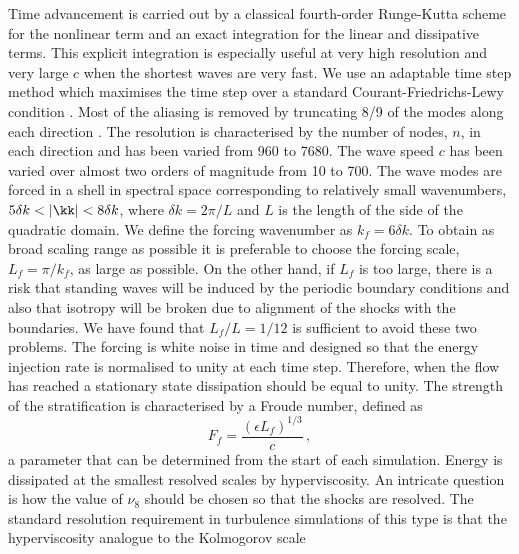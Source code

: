 %
Time advancement is carried out by a classical fourth-order Runge-Kutta scheme
for the nonlinear term and an exact integration for the linear and dissipative
terms. This explicit integration is especially useful at very high resolution
and very large $c$ when the shortest waves are very fast. We use an adaptable
time step method which maximises the time step over a standard
Courant-Friedrichs-Lewy condition \citep{Lundbladh1999, AugierChomazBillant2012}.
%
Most of the aliasing is removed by truncating 8/9 of the modes along each
direction \citep[for a detailed discussion on the issues of the non-conservation
of the non-quadratic energy and the aliasing errors in the truncated one-layer
shallow water model, see][]{FargeSadourny1989}. The resolution is characterised
by the number of nodes, $n$, in each direction and has been varied from 960
to 7680.
%
The wave speed $c$ has been varied over almost two orders of magnitude from 10
to 700. The wave modes are forced in a shell in spectral space corresponding to
relatively small wavenumbers, $ 5 \delta k < |\kk| < 8 \delta k$, where $
\delta k = 2 \pi /L $ and $ L $ is the length of the side of the quadratic
domain.  We define the forcing wavenumber as $ k_f = 6 \delta k $. To obtain as broad scaling range as possible it is preferable to choose
the forcing scale, $ L_f = \pi/k_f $, as large as possible. On the other hand, if $ L_f $ is too large, there is a risk that standing waves will be induced by the periodic boundary conditions and also that isotropy will be broken due to alignment of the shocks with the boundaries.
We have found that $ L_f/L =1/12 $ is sufficient to avoid these two problems.
The forcing is white noise in time and designed so that the energy
injection rate is normalised to unity at each time step.
Therefore, when the flow has reached a stationary state dissipation should be equal to unity.
The strength of the stratification is characterised by a
Froude number, defined as
\begin{equation} \label{Fr}
F_f = \frac{(\epsilon L_f)^{1/3}}{c} \, ,
\end{equation}
a parameter that can be determined from the start of each simulation.
Energy is dissipated at the smallest resolved scales by hyperviscosity. An intricate question is how the value of $ \nu_{8} $ should be chosen so that the shocks are resolved. The standard resolution requirement in turbulence simulations of this type is that the hyperviscosity analogue to the Kolmogorov scale
